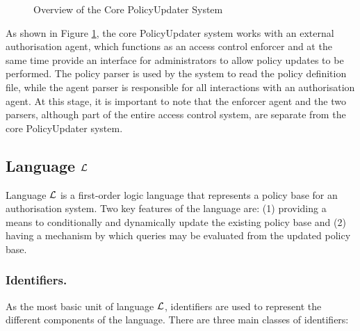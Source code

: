\documentclass[11pt]{llncs}
\begin{document}
    \begin{figure}[ht]
      \begin{center}
        \caption{Overview of the Core PolicyUpdater System}
        \label{fig-1}
      \end{center}
    \end{figure}

    As shown in Figure \ref{fig-1}, the core PolicyUpdater system works with an
    external authorisation agent, which functions as an access control enforcer
    and at the same time provide an interface for administrators to allow
    policy updates to be performed. The policy parser is used by the system to
    read the policy definition file, while the agent parser is responsible for
    all interactions with an authorisation agent. At this stage, it is
    important to note that the enforcer agent and the two parsers, although
    part of the entire access control system, are separate from the core
    PolicyUpdater system.

    \subsection{Language ${\cal L}$}
      Language $\cal{L}$ is a first-order logic language that represents a
      policy base for an authorisation system. Two key features of the
      language are: (1) providing a means to conditionally and dynamically
      update  the existing policy base and (2) having a mechanism by which
      queries may be evaluated from the updated policy base.

      \subsubsection{Identifiers.}

        As the most basic unit of language ${\cal L}$, identifiers are used to
        represent the different components of the language. There are three
        main classes of identifiers:
\end{document}
